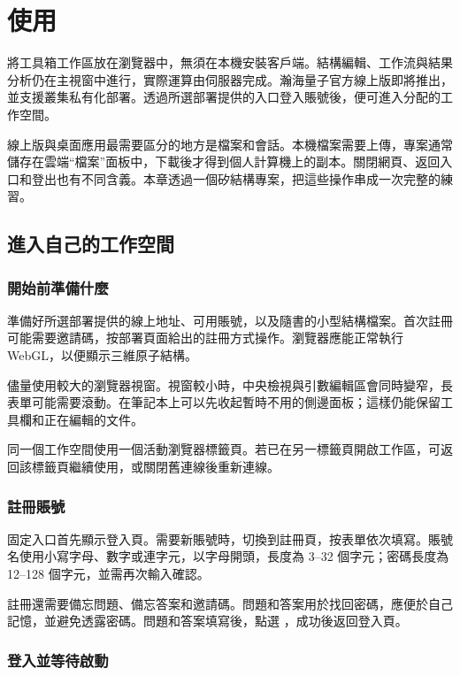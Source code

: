 \chapter{使用 \headinglatin{\ksonline}}\label{ch:online}

\ksonline{} 將工具箱工作區放在瀏覽器中，無須在本機安裝客戶端。結構編輯、工作流與結果分析仍在主視窗中進行，實際運算由伺服器完成。瀚海量子\regmark{}官方線上版即將推出，並支援叢集私有化部署。透過所選部署提供的入口登入賬號後，便可進入分配的工作空間。

線上版與桌面應用最需要區分的地方是檔案和會話。本機檔案需要上傳，專案通常儲存在雲端“檔案”面板中，下載後才得到個人計算機上的副本。關閉網頁、返回入口和登出也有不同含義。本章透過一個矽結構專案，把這些操作串成一次完整的練習。

\section{進入自己的工作空間}

\subsection{開始前準備什麼}

準備好所選部署提供的線上地址、可用賬號，以及隨書的小型結構檔案。首次註冊可能需要邀請碼，按部署頁面給出的註冊方式操作。瀏覽器應能正常執行 WebGL，以便顯示三維原子結構。

儘量使用較大的瀏覽器視窗。視窗較小時，中央檢視與引數編輯區會同時變窄，長表單可能需要滾動。在筆記本上可以先收起暫時不用的側邊面板；這樣仍能保留工具欄和正在編輯的文件。

同一個工作空間使用一個活動瀏覽器標籤頁。若已在另一標籤頁開啟工作區，可返回該標籤頁繼續使用，或關閉舊連線後重新連線。

\subsection{註冊賬號}

固定入口首先顯示登入頁。需要新賬號時，切換到註冊頁，按表單依次填寫。賬號名使用小寫字母、數字或連字元，以字母開頭，長度為 3--32 個字元；密碼長度為 12--128 個字元，並需再次輸入確認。

註冊還需要備忘問題、備忘答案和邀請碼。問題和答案用於找回密碼，應便於自己記憶，並避免透露密碼。問題和答案填寫後，點選 ，成功後返回登入頁。


\subsection{登入並等待啟動}

